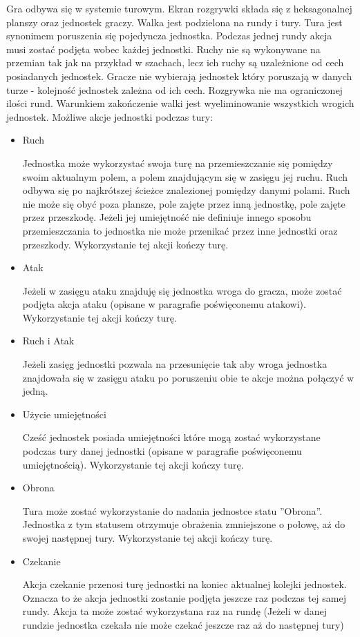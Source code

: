 \documentclass[letterpaper,12pt]{article}
\begin{document}
Gra odbywa się w systemie turowym. Ekran rozgrywki składa się z heksagonalnej planszy oraz jednostek graczy.
Walka jest podzielona na rundy i tury. Tura jest synonimem poruszenia się pojedyncza jednostka. Podczas jednej rundy akcja musi zostać podjęta wobec każdej jednostki. Ruchy nie są wykonywane na przemian tak jak na przykład w szachach, lecz ich ruchy są uzależnione od cech posiadanych jednostek. Gracze nie wybierają jednostek który poruszają w danych turze - kolejność jednostek zależna od ich cech. Rozgrywka nie ma ograniczonej ilości rund. Warunkiem zakończenie walki jest wyeliminowanie wszystkich wrogich jednostek.
Możliwe akcje jednostki podczas tury:
\begin{itemize}  
\item Ruch 
\par Jednostka może wykorzystać swoja turę na przemieszczanie się pomiędzy swoim aktualnym polem, a polem znajdującym się w zasięgu jej ruchu. Ruch odbywa się po najkrótszej ścieżce znalezionej pomiędzy danymi polami. Ruch nie może się obyć poza plansze, pole zajęte przez inną jednostkę, pole zajęte przez przeszkodę. Jeżeli jej umiejętność nie definiuje innego sposobu przemieszczania to jednostka nie może przenikać przez inne jednostki oraz przeszkody. Wykorzystanie tej akcji kończy turę. 
\item Atak
\par Jeżeli w zasięgu ataku znajduję się jednostka wroga do gracza, może zostać podjęta akcja ataku (opisane w paragrafie poświęconemu atakowi). Wykorzystanie tej akcji kończy turę. 
\item Ruch i Atak
\par Jeżeli zasięg jednostki pozwala na przesunięcie tak aby wroga jednostka znajdowała się w zasięgu ataku po poruszeniu obie te akcje można połączyć w jedną.
\item Użycie umiejętności 
\par Cześć jednostek posiada umiejętności które mogą zostać wykorzystane podczas tury danej jednostki  (opisane w paragrafie poświęconemu umiejętnością). Wykorzystanie tej akcji kończy turę. 
\item Obrona
\par Tura może zostać wykorzystanie do nadania jednostce statu ''Obrona''. Jednostka z tym statusem otrzymuje obrażenia zmniejszone o połowę, aż do swojej następnej tury. Wykorzystanie tej akcji kończy turę. 
\item Czekanie
\par Akcja czekanie przenosi turę jednostki na koniec aktualnej kolejki jednostek. Oznacza to że akcja jednostki zostanie podjęta jeszcze raz podczas tej samej rundy. Akcja ta może zostać wykorzystana raz na rundę (Jeżeli w danej rundzie jednostka czekała nie może czekać jeszcze raz aż do następnej tury) 
\end{itemize}
 
\end{document}
